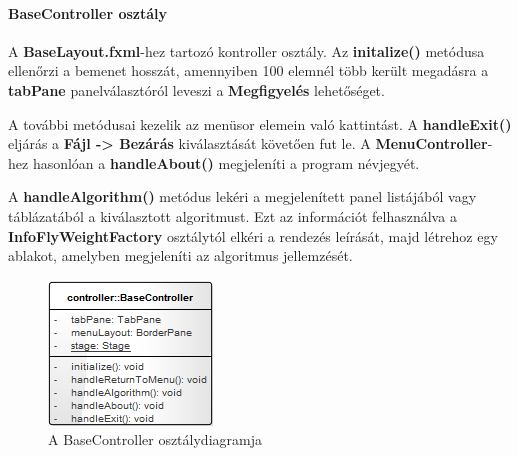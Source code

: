 \documentclass{elteikthesis}
\begin{document}
\paragraph{BaseController osztály}
A \textbf{BaseLayout.fxml}-hez tartozó kontroller osztály. Az \textbf{initalize()} metódusa ellenőrzi a bemenet hosszát, amennyiben 100 elemnél több került megadásra a \textbf{tabPane} panelválasztóról leveszi a \textbf{Megfigyelés} lehetőséget.\par
 A további metódusai kezelik az menüsor elemein való kattintást. A \textbf{handleExit()} eljárás a \textbf{Fájl -> Bezárás} kiválasztását követően fut le. A \textbf{MenuController}-hez hasonlóan a \textbf{handleAbout()} megjeleníti a program névjegyét.\par
 A \textbf{handleAlgorithm()} metódus lekéri a megjelenített panel listájából vagy táblázatából a kiválasztott algoritmust. Ezt az információt felhasználva a \textbf{InfoFlyWeightFactory} osztálytól elkéri a  rendezés leírását, majd létrehoz egy ablakot, amelyben megjeleníti az algoritmus jellemzését.
\begin{figure}[H]
	\centering
	\includegraphics{pics/class/BaseController.png}
	\caption{A BaseController osztálydiagramja}
\end{figure}
\end{document}
